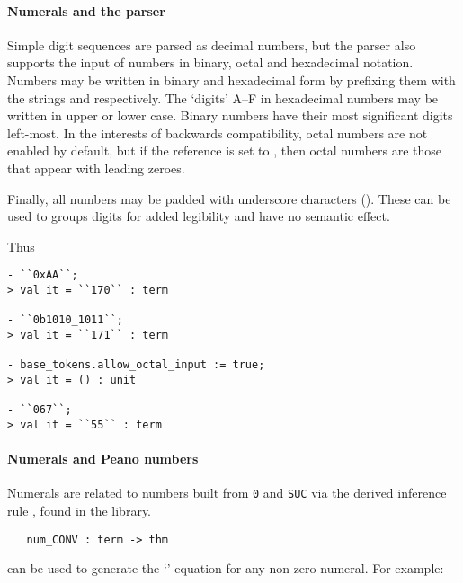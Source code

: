 \paragraph{Numerals and the parser}
%
%
Simple digit sequences are parsed as decimal numbers, but the parser
also supports the input of numbers in binary, octal and hexadecimal
notation.  Numbers may be written in binary and hexadecimal form by
prefixing them with the strings  and  respectively.  The
`digits' A--F in hexadecimal numbers may be written in upper or lower
case.  Binary numbers have their most significant digits left-most. In
the interests of backwards compatibility, octal numbers are not
enabled by default, but if the reference
 is set to , then octal
numbers are those that appear with leading zeroes.

Finally, all numbers may be padded with underscore characters
(\ml{\_}).  These can be used to groups digits for added legibility
and have no semantic effect.

Thus
\begin{boxed}
\begin{verbatim}
- ``0xAA``;
> val it = ``170`` : term

- ``0b1010_1011``;
> val it = ``171`` : term

- base_tokens.allow_octal_input := true;
> val it = () : unit

- ``067``;
> val it = ``55`` : term
\end{verbatim}
\end{boxed}

\paragraph{Numerals and Peano numbers}

Numerals are related to numbers built from {\small\verb+0+} and
{\small\verb+SUC+} via the derived inference rule
, found in the  library.

\begin{boxed}
\begin{verbatim}
   num_CONV : term -> thm
\end{verbatim}
\end{boxed}

\noindent {} can be used to generate the `'
equation for any non-zero numeral.  For example:

